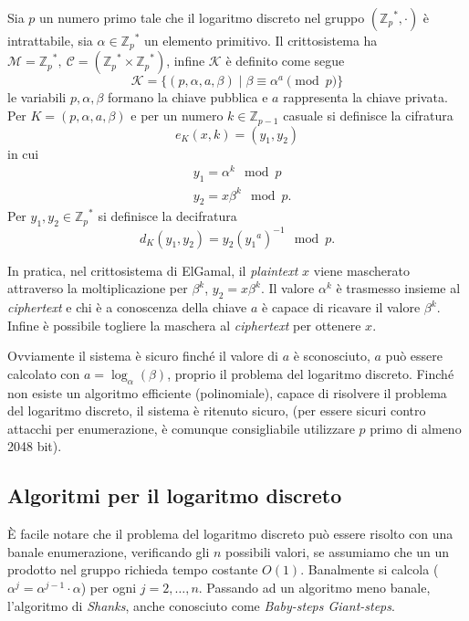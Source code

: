 \begin{definition}[ElGamal]
    Sia $p$ un numero primo tale che il logaritmo discreto nel gruppo $({\mathbb{Z}_p}^*,\cdot)$ è intrattabile, sia $\alpha \in {\mathbb{Z}_p}^*$ un elemento primitivo.
    Il crittosistema ha $\mathcal{M} = {\mathbb{Z}_p}^*,\  \mathcal{C} = ({\mathbb{Z}_p}^* \times {\mathbb{Z}_p}^*)$, infine $\mathcal{K}$ è definito come segue
    \[
        \mathcal{K} = \{ (p,\alpha,a,\beta) \mid \beta \equiv \alpha^a \pmod p\}
    \]
    le variabili $p,\alpha,\beta$ formano la chiave pubblica e $a$ rappresenta la chiave privata.
    Per $K = (p,\alpha,a,\beta)$ e per un numero $k \in \mathbb{Z}_{p-1}$ casuale si definisce la cifratura
    \[
        e_K(x,k) = (y_1,y_2)
    \]  in cui 
    \begin{align*}
        &y_1 = {\alpha}^k \mod p\\
        &y_2 = x\beta^k \mod p.
    \end{align*}
    Per $y_1,y_2 \in {\mathbb{Z}_p}^*$ si definisce la decifratura
    \[
        d_K(y_1,y_2) = y_2({y_1}^a)^{-1} \mod p.
    \] 
\end{definition}

\noindent
In pratica, nel crittosistema di ElGamal, il \emph{plaintext} $x$ viene mascherato attraverso la moltiplicazione per $\beta^k$, $y_2 = x\beta^k$. Il valore $\alpha^k$ è trasmesso insieme al \emph{ciphertext} e chi è a conoscenza della chiave $a$ è capace di ricavare il valore $\beta^k$. Infine è possibile togliere la maschera al \emph{ciphertext} per ottenere $x$.

\vspace{1em}
Ovviamente il sistema è sicuro finché il valore di $a$ è sconosciuto, $a$ può essere calcolato con $a = \log_{\alpha}(\beta)$, proprio il problema del logaritmo discreto. Finché non esiste un algoritmo efficiente (polinomiale), capace di risolvere il problema del logaritmo discreto, il sistema è ritenuto sicuro, (per essere sicuri contro attacchi per enumerazione, è comunque consigliabile utilizzare $p$ primo di almeno 2048 bit).


\subsection{Algoritmi per il logaritmo discreto}
È facile notare che il problema del logaritmo discreto può essere risolto con una banale enumerazione, verificando gli $n$ possibili valori, se assumiamo che un un prodotto nel gruppo richieda tempo costante $O(1)$. Banalmente si calcola ($\alpha^{j} = \alpha^{j-1}\cdot \alpha$) per ogni $j = 2,\dots,n$. Passando ad un algoritmo meno banale, l'algoritmo di \emph{Shanks}, anche conosciuto come \emph{Baby-steps Giant-steps}.

